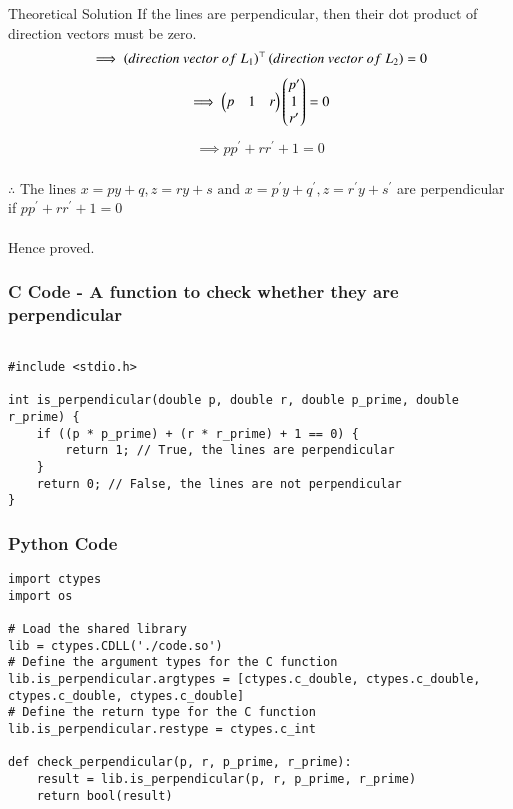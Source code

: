 \documentclass{beamer}
\begin{document}
\begin{frame}{Theoretical Solution}
If the lines are perpendicular, then their dot product of direction vectors must be zero.
\begin{align}
    \implies \brak{direction\ vector\ of\ L_1}^\top\brak{direction\ vector\ of\ L_2} = 0
\end{align}
\begin{align}
\implies \begin{pmatrix}p & 1 & r\end{pmatrix} \begin{pmatrix}p^{\prime}\\1\\r^{\prime}\end{pmatrix} = 0
\end{align}
\begin{align}
\implies pp^{\prime}+rr^{\prime}+1=0
\end{align}\\
\bigskip
$\therefore$ The lines $x=py+q , z=ry+s \text{ and } x=p^{\prime}y+q^{\prime}, z=r^{\prime}y+s^{\prime} $ are perpendicular if $pp^{\prime}+rr^{\prime}+1=0$\\
\\
Hence proved.
\end{frame}


\begin{frame}[fragile]
    \frametitle{C Code - A function to check whether they are perpendicular}

    \begin{lstlisting}

#include <stdio.h>

int is_perpendicular(double p, double r, double p_prime, double r_prime) {
    if ((p * p_prime) + (r * r_prime) + 1 == 0) {
        return 1; // True, the lines are perpendicular
    }
    return 0; // False, the lines are not perpendicular
}
    \end{lstlisting}
\end{frame}

\begin{frame}[fragile]
    \frametitle{Python Code}
    \begin{lstlisting}
import ctypes
import os

# Load the shared library
lib = ctypes.CDLL('./code.so')
# Define the argument types for the C function
lib.is_perpendicular.argtypes = [ctypes.c_double, ctypes.c_double, ctypes.c_double, ctypes.c_double]
# Define the return type for the C function
lib.is_perpendicular.restype = ctypes.c_int

def check_perpendicular(p, r, p_prime, r_prime):
    result = lib.is_perpendicular(p, r, p_prime, r_prime)
    return bool(result)

    \end{lstlisting}
\end{frame}
\end{document}
